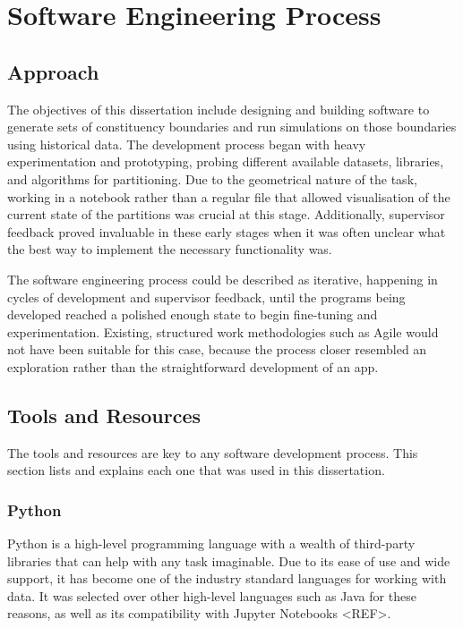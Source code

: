 \documentclass{article}
\begin{document}
\section{Software Engineering Process}

\subsection{Approach}

The objectives of this dissertation include designing and building software to generate sets of constituency boundaries and run simulations on those boundaries using historical data.
The development process began with heavy experimentation and prototyping, probing different available datasets, libraries, and algorithms for partitioning. Due to the geometrical nature
of the task, working in a notebook rather than a regular file that allowed visualisation of the current state of the partitions was crucial at this stage. Additionally, supervisor feedback
proved invaluable in these early stages when it was often unclear what the best way to implement the necessary functionality was.

The software engineering process could be described as iterative, happening in cycles of development and supervisor feedback, until the programs being developed reached a polished enough state
to begin fine-tuning and experimentation. Existing, structured work methodologies such as Agile would not have been suitable for this case, because the process closer resembled an exploration 
rather than the straightforward development of an app.

\subsection{Tools and Resources}
The tools and resources are key to any software development process. This section lists and explains each one that was used in this dissertation.

\subsubsection{Python}
Python is a high-level programming language with a wealth of third-party libraries that can help with any task imaginable. Due to its ease of use and wide support, it has become one of the 
industry standard languages for working with data. It was selected over other high-level languages such as Java for these reasons, as well as its compatibility with Jupyter Notebooks <REF>.
\end{document}
